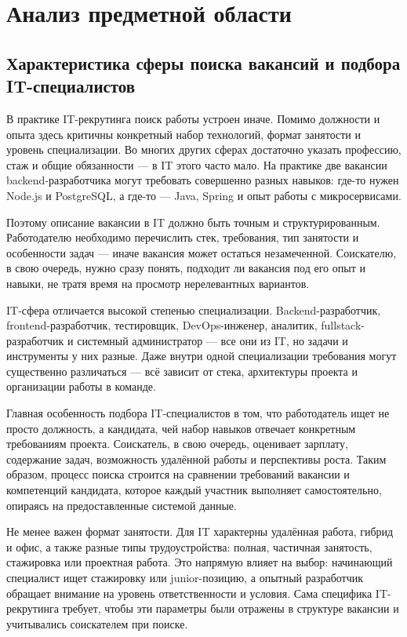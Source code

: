 \section{Анализ предметной области}
\subsection{Характеристика сферы поиска вакансий и подбора IT-специалистов}

В практике IT-рекрутинга поиск работы устроен иначе. Помимо должности и опыта здесь критичны конкретный набор технологий, формат занятости и уровень специализации. Во многих других сферах достаточно указать профессию, стаж и общие обязанности — в IT этого часто мало. На практике две вакансии backend-разработчика могут требовать совершенно разных навыков: где-то нужен Node.js и PostgreSQL, а где-то — Java, Spring и опыт работы с микросервисами.

Поэтому описание вакансии в IT должно быть точным и структурированным. Работодателю необходимо перечислить стек, требования, тип занятости и особенности задач — иначе вакансия может остаться незамеченной. Соискателю, в свою очередь, нужно сразу понять, подходит ли вакансия под его опыт и навыки, не тратя время на просмотр нерелевантных вариантов.

IT-сфера отличается высокой степенью специализации. Backend-разработчик, frontend-разработчик, тестировщик, DevOps-инженер, аналитик, fullstack-разработчик и системный администратор — все они из IT, но задачи и инструменты у них разные. Даже внутри одной специализации требования могут существенно различаться — всё зависит от стека, архитектуры проекта и организации работы в команде.

Главная особенность подбора IT-специалистов в том, что работодатель ищет не просто должность, а кандидата, чей набор навыков отвечает конкретным требованиям проекта. Соискатель, в свою очередь, оценивает зарплату, содержание задач, возможность удалённой работы и перспективы роста. Таким образом, процесс поиска строится на сравнении требований вакансии и компетенций кандидата, которое каждый участник выполняет самостоятельно, опираясь на предоставленные системой данные.

Не менее важен формат занятости. Для IT характерны удалённая работа, гибрид и офис, а также разные типы трудоустройства: полная, частичная занятость, стажировка или проектная работа. Это напрямую влияет на выбор: начинающий специалист ищет стажировку или junior-позицию, а опытный разработчик обращает внимание на уровень ответственности и условия. Сама специфика IT-рекрутинга требует, чтобы эти параметры были отражены в структуре вакансии и учитывались соискателем при поиске.

